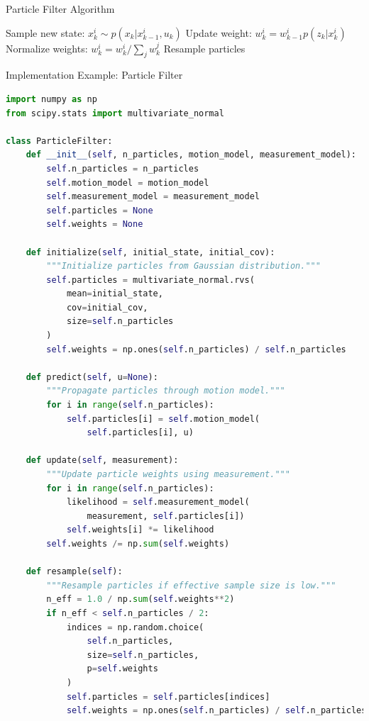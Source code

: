 \documentclass[aspectratio=169]{beamer}
\begin{document}
\begin{frame}{Particle Filter Algorithm}
    \begin{algorithm}[H]
    \begin{algorithmic}[1]
                \State Sample new state: $x_k^i \sim p(x_k|x_{k-1}^i, u_k)$
                \State Update weight: $w_k^i = w_{k-1}^i p(z_k|x_k^i)$
            \EndFor
            \State Normalize weights: $w_k^i = w_k^i/\sum_j w_k^j$
                \State Resample particles
            \EndIf
        \EndFor
    \end{algorithmic}
    \end{algorithm}
\end{frame}

\begin{frame}[fragile]{Implementation Example: Particle Filter}
\begin{lstlisting}[language=Python]
import numpy as np
from scipy.stats import multivariate_normal

class ParticleFilter:
    def __init__(self, n_particles, motion_model, measurement_model):
        self.n_particles = n_particles
        self.motion_model = motion_model
        self.measurement_model = measurement_model
        self.particles = None
        self.weights = None
        
    def initialize(self, initial_state, initial_cov):
        """Initialize particles from Gaussian distribution."""
        self.particles = multivariate_normal.rvs(
            mean=initial_state,
            cov=initial_cov,
            size=self.n_particles
        )
        self.weights = np.ones(self.n_particles) / self.n_particles
        
    def predict(self, u=None):
        """Propagate particles through motion model."""
        for i in range(self.n_particles):
            self.particles[i] = self.motion_model(
                self.particles[i], u)
            
    def update(self, measurement):
        """Update particle weights using measurement."""
        for i in range(self.n_particles):
            likelihood = self.measurement_model(
                measurement, self.particles[i])
            self.weights[i] *= likelihood
        self.weights /= np.sum(self.weights)
        
    def resample(self):
        """Resample particles if effective sample size is low."""
        n_eff = 1.0 / np.sum(self.weights**2)
        if n_eff < self.n_particles / 2:
            indices = np.random.choice(
                self.n_particles,
                size=self.n_particles,
                p=self.weights
            )
            self.particles = self.particles[indices]
            self.weights = np.ones(self.n_particles) / self.n_particles
\end{lstlisting}
\end{frame}
\end{document}
